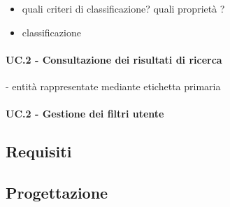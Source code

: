 \begin{itemize}
	\item quali criteri di classificazione? quali proprietà ?
	\item classificazione
\end{itemize}

\paragraph{UC.2 - Consultazione dei risultati di ricerca}
- entità rappresentate mediante etichetta primaria

\paragraph{UC.2 - Gestione dei filtri utente}

\subsection{Requisiti}

\subsection{Progettazione}
